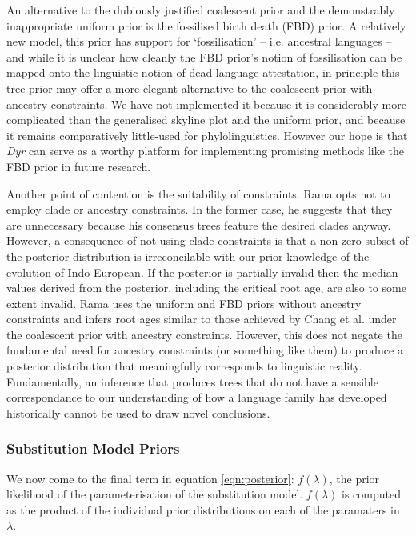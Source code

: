 \documentclass[10pt,journal,compsoc]{IEEEtran}
\begin{document}
An alternative to the dubiously justified coalescent prior and the demonstrably inappropriate uniform prior is the fossilised birth death (FBD) prior. A relatively new model, this prior has support for `fossilisation' -- i.e. ancestral languages -- and while it is unclear how cleanly the FBD prior's notion of fossilisation can be mapped onto the linguistic notion of dead language attestation, in principle this tree prior may offer a more elegant alternative to the coalescent prior with ancestry constraints. We have not implemented it because it is considerably more complicated than the generalised skyline plot and the uniform prior, and because it remains comparatively little-used for phylolinguistics. However our hope is that  \textit{Dyr} can serve as a worthy platform for implementing promising methods like the FBD prior in future research.

Another point of contention is the suitability of constraints. Rama opts not to employ clade or ancestry constraints. In the former case, he suggests that they are unnecessary because his consensus trees feature the desired clades anyway. However, a consequence of not using clade constraints is that a non-zero subset of the posterior distribution is irreconcilable with our prior knowledge of the evolution of Indo-European. If the posterior is partially invalid then the median values derived from the posterior, including the critical root age, are also to some extent invalid. Rama uses the uniform and FBD priors without ancestry constraints and infers root ages similar to those achieved by Chang et al. under the coalescent prior with ancestry constraints. However, this does not negate the fundamental need for ancestry constraints (or something like them) to produce a posterior distribution that meaningfully corresponds to linguistic reality. Fundamentally, an inference that produces trees that do not have a sensible correspondance to our understanding of how a language family has developed historically cannot be used to draw novel conclusions.

\subsubsection{Substitution Model Priors}

We now come to the final term in equation \eqref{eqn:posterior}: $f(\lambda)$, the prior likelihood of the parameterisation of the substitution model. $f(\lambda)$ is computed as the product of the individual prior distributions on each of the paramaters in $\lambda$.
\end{document}
